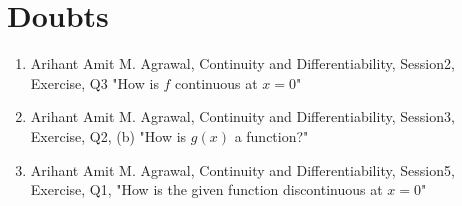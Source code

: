 \documentclass{article}
\title{}
\author{}
\date{}
\begin{document}
\maketitle

\section{Doubts}
\begin{enumerate}
    \item Arihant Amit M. Agrawal, Continuity and Differentiability, Session2, Exercise, Q3 "How is $f$ continuous at $x=0$"
    \item Arihant Amit M. Agrawal, Continuity and Differentiability, Session3, Exercise, Q2, (b) "How is $g(x)$ a function?"
    \item Arihant Amit M. Agrawal, Continuity and Differentiability, Session5, Exercise, Q1, "How is the given function discontinuous at $x=0$"
\end{enumerate}
\end{document}
